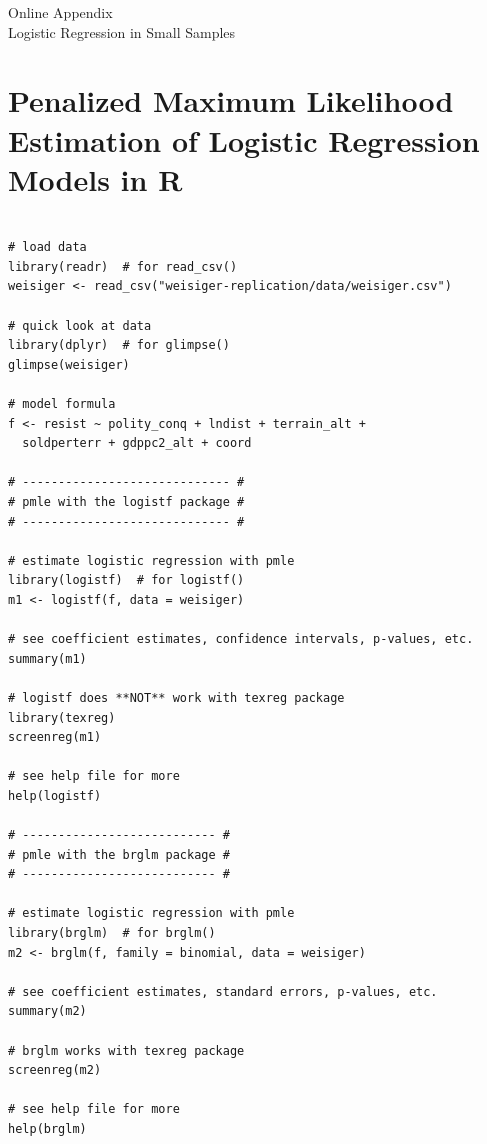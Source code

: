 \documentclass[12pt]{article}
\begin{document}
\singlespace 
\newpage
\normalsize


%

\newpage
\begin{appendix}
\begin{center}
{\LARGE Online Appendix}\\
{\large Logistic Regression in Small Samples}\\\vspace{2mm}
\end{center}


\section{Penalized Maximum Likelihood Estimation of Logistic Regression Models in R}\label{sec:pmle-in-R}

\begin{verbatim}

# load data
library(readr)  # for read_csv()
weisiger <- read_csv("weisiger-replication/data/weisiger.csv")

# quick look at data
library(dplyr)  # for glimpse()
glimpse(weisiger)

# model formula
f <- resist ~ polity_conq + lndist + terrain_alt + 
  soldperterr + gdppc2_alt + coord

# ----------------------------- #
# pmle with the logistf package #
# ----------------------------- #

# estimate logistic regression with pmle
library(logistf)  # for logistf()
m1 <- logistf(f, data = weisiger)

# see coefficient estimates, confidence intervals, p-values, etc.
summary(m1)

# logistf does **NOT** work with texreg package
library(texreg)
screenreg(m1)

# see help file for more
help(logistf)

# --------------------------- #
# pmle with the brglm package #
# --------------------------- #

# estimate logistic regression with pmle
library(brglm)  # for brglm()
m2 <- brglm(f, family = binomial, data = weisiger)

# see coefficient estimates, standard errors, p-values, etc.
summary(m2)

# brglm works with texreg package
screenreg(m2)

# see help file for more
help(brglm)
\end{verbatim}



\end{appendix}
\end{document}
